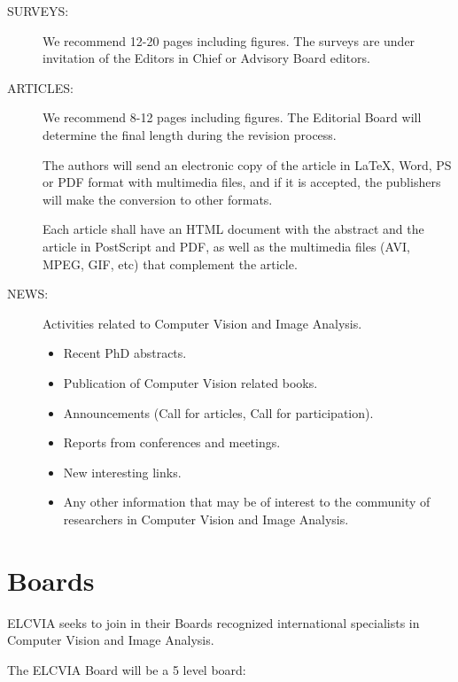 \documentclass[twoside,a4paper,11pt]{article}
\begin{document}
\begin{description}
\item[SURVEYS:] We recommend 12-20 pages including figures. The surveys are
under invitation of the Editors in Chief or Advisory Board editors.

\item[ARTICLES:] We recommend 8-12 pages including figures. The Editorial
Board will determine the final length during the revision process.

The authors will send an electronic copy of the article in \LaTeX, Word,
PS or PDF format with multimedia files, and if it is accepted,
the publishers will make the conversion to other formats.

Each article shall have an HTML document with the abstract and
the article in  PostScript and PDF, as well as the multimedia files
(AVI, MPEG, GIF, etc) that complement the article.

\item[NEWS:] Activities related to Computer Vision and Image Analysis.
\begin{itemize}
\item Recent PhD abstracts.
\item Publication of Computer Vision related books.
\item Announcements (Call for articles, Call for participation).
\item Reports from conferences and meetings.
\item New interesting links.
\item Any other information that may be of interest to the community of
researchers in Computer Vision and Image Analysis.
\end{itemize}
\end{description}

\section{Boards}

ELCVIA seeks to join in their Boards recognized international specialists in Computer 
Vision and Image Analysis.

The ELCVIA Board will be a 5 level board:
\end{document}
